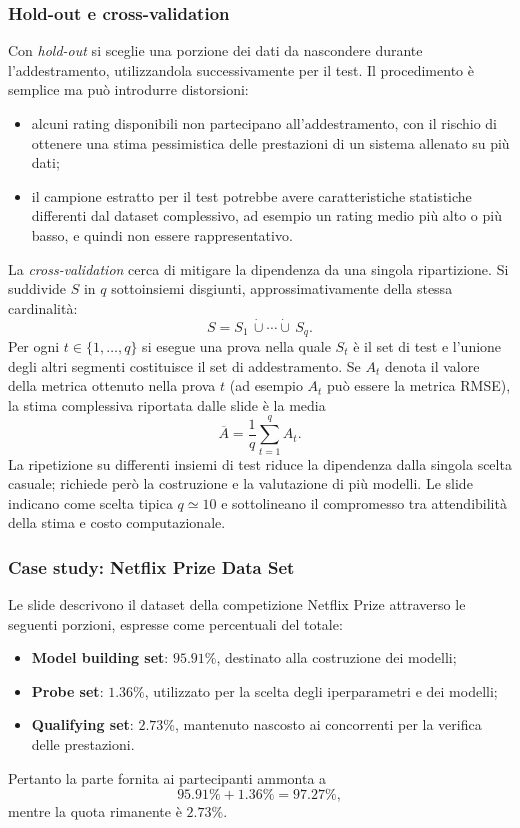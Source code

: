 \newpage
\subsubsection{Hold-out e cross-validation}
Con \emph{hold-out} si sceglie una porzione dei dati da nascondere durante l'addestramento, utilizzandola successivamente per il test. Il procedimento è semplice ma può introdurre distorsioni:
\begin{itemize}
    \item alcuni rating disponibili non partecipano all'addestramento, con il rischio di ottenere una stima pessimistica delle prestazioni di un sistema allenato su più dati;
    \item il campione estratto per il test potrebbe avere caratteristiche statistiche differenti dal dataset complessivo, ad esempio un rating medio più alto o più basso, e quindi non essere rappresentativo.
\end{itemize}
La \emph{cross-validation} cerca di mitigare la dipendenza da una singola ripartizione. Si suddivide $S$ in $q$ sottoinsiemi disgiunti, approssimativamente della stessa cardinalità:
\[
S=S_1\,\dot\cup\cdots\dot\cup\,S_q.
\]
Per ogni $t\in\{1,\ldots,q\}$ si esegue una prova nella quale $S_t$ è il set di test e l'unione degli altri segmenti costituisce il set di addestramento. Se $A_t$ denota il valore della metrica ottenuto nella prova $t$ (ad esempio $A_t$ può essere la metrica RMSE), la stima complessiva riportata dalle slide è la media
\[
\overline A=\frac{1}{q}\sum_{t=1}^{q}A_t.
\]
La ripetizione su differenti insiemi di test riduce la dipendenza dalla singola scelta casuale; richiede però la costruzione e la valutazione di più modelli. Le slide indicano come scelta tipica $q\simeq10$ e sottolineano il compromesso tra attendibilità della stima e costo computazionale.

\subsubsection{Case study: Netflix Prize Data Set}
Le slide descrivono il dataset della competizione Netflix Prize attraverso le seguenti porzioni, espresse come percentuali del totale:
\begin{itemize}
    \item \textbf{Model building set}: $95.91\%$, destinato alla costruzione dei modelli;
    \item \textbf{Probe set}: $1.36\%$, utilizzato per la scelta degli iperparametri e dei modelli;
    \item \textbf{Qualifying set}: $2.73\%$, mantenuto nascosto ai concorrenti per la verifica delle prestazioni.
\end{itemize}
Pertanto la parte fornita ai partecipanti ammonta a
\[
95.91\%+1.36\%=97.27\%,
\]
mentre la quota rimanente è $2.73\%$.

